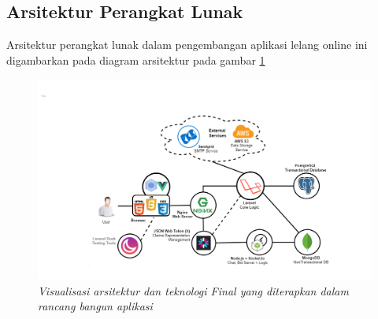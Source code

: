
\subsection{Arsitektur Perangkat Lunak}
	\label{final-arch-tech}
	Arsitektur perangkat lunak dalam pengembangan aplikasi lelang online ini digambarkan pada diagram arsitektur pada gambar \ref{final-arch-tech-figure}
	\newpage
	
	\begin{figure}[H]
		\centering
		\includegraphics[height=.9\textheight]{images/bab3/arsitektur-app.png}
		\caption{\textit{Visualisasi arsitektur dan teknologi Final yang diterapkan dalam rancang bangun aplikasi}}
			\label{final-arch-tech-figure}
	\end{figure}
	
	
